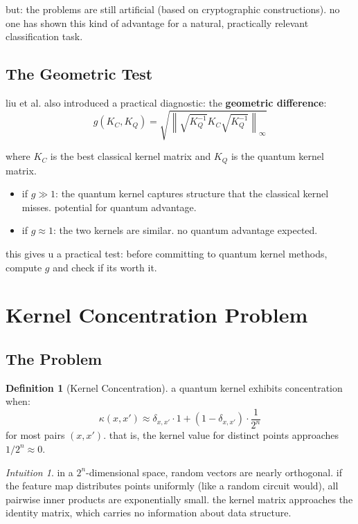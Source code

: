 \documentclass[11pt,a4paper]{article}
\theoremstyle{definition}
\newtheorem{definition}{Definition}[section]
\theoremstyle{remark}
\newtheorem*{intuition}{Intuition}
\begin{document}
but: the problems are still artificial (based on cryptographic constructions). no one has shown this kind of advantage for a natural, practically relevant classification task.

\subsection{The Geometric Test}

liu et al. also introduced a practical diagnostic: the \textbf{geometric difference}:
\[
g(K_C, K_Q) = \sqrt{\left\|\sqrt{K_Q^{-1}} K_C \sqrt{K_Q^{-1}}\right\|_\infty}
\]

where $K_C$ is the best classical kernel matrix and $K_Q$ is the quantum kernel matrix.

\begin{itemize}
    \item if $g \gg 1$: the quantum kernel captures structure that the classical kernel misses. potential for quantum advantage.
    \item if $g \approx 1$: the two kernels are similar. no quantum advantage expected.
\end{itemize}

this gives u a practical test: before committing to quantum kernel methods, compute $g$ and check if its worth it.

\section{Kernel Concentration Problem}

\subsection{The Problem}

\begin{definition}[Kernel Concentration]
a quantum kernel exhibits concentration when:
\[
\kappa(x, x') \approx \delta_{x,x'} \cdot 1 + (1 - \delta_{x,x'}) \cdot \frac{1}{2^n}
\]
for most pairs $(x, x')$. that is, the kernel value for distinct points approaches $1/2^n \approx 0$.
\end{definition}

\begin{intuition}
in a $2^n$-dimensional space, random vectors are nearly orthogonal. if the feature map distributes points uniformly (like a random circuit would), all pairwise inner products are exponentially small. the kernel matrix approaches the identity matrix, which carries no information about data structure.
\end{intuition}
\end{document}
